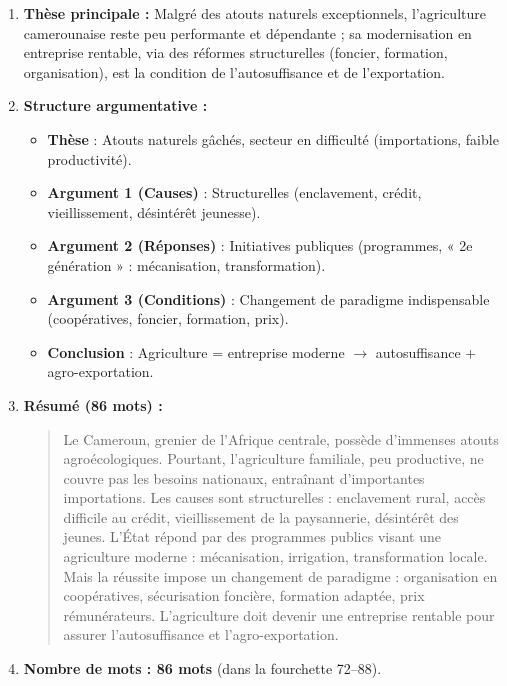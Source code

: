\documentclass[11pt]{article}
\begin{document}
\begin{corrige}
\begin{enumerate}
    \item \textbf{Thèse principale :} Malgré des atouts naturels exceptionnels, l'agriculture camerounaise reste peu performante et dépendante ; sa modernisation en entreprise rentable, via des réformes structurelles (foncier, formation, organisation), est la condition de l'autosuffisance et de l'exportation.
    \item \textbf{Structure argumentative :}
    \begin{itemize}
        \item \textbf{Thèse} : Atouts naturels gâchés, secteur en difficulté (importations, faible productivité).
        \item \textbf{Argument 1 (Causes)} : Structurelles (enclavement, crédit, vieillissement, désintérêt jeunesse).
        \item \textbf{Argument 2 (Réponses)} : Initiatives publiques (programmes, « 2e génération » : mécanisation, transformation).
        \item \textbf{Argument 3 (Conditions)} : Changement de paradigme indispensable (coopératives, foncier, formation, prix).
        \item \textbf{Conclusion} : Agriculture = entreprise moderne $\to$ autosuffisance + agro-exportation.
    \end{itemize}
    \item \textbf{Résumé (86 mots) :}
    \begin{quote}
    Le Cameroun, grenier de l'Afrique centrale, possède d'immenses atouts agroécologiques. Pourtant, l'agriculture familiale, peu productive, ne couvre pas les besoins nationaux, entraînant d'importantes importations. Les causes sont structurelles : enclavement rural, accès difficile au crédit, vieillissement de la paysannerie, désintérêt des jeunes. L'État répond par des programmes publics visant une agriculture moderne : mécanisation, irrigation, transformation locale. Mais la réussite impose un changement de paradigme : organisation en coopératives, sécurisation foncière, formation adaptée, prix rémunérateurs. L'agriculture doit devenir une entreprise rentable pour assurer l'autosuffisance et l'agro-exportation.
    \end{quote}
    \item \textbf{Nombre de mots : 86 mots} (dans la fourchette 72--88).
\end{enumerate}
\end{corrige}
\end{document}
